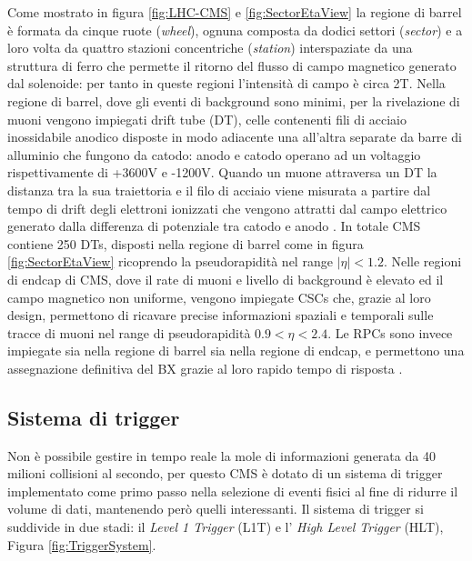 Come mostrato in figura \ref{fig:LHC-CMS} e \ref{fig:SectorEtaView} la regione di barrel è formata da cinque ruote (\textit{wheel}), ognuna composta da dodici settori (\textit{sector}) e a loro volta da quattro stazioni concentriche (\textit{station}) interspaziate da una struttura di ferro che permette il ritorno del flusso di campo magnetico generato dal solenoide: per tanto in queste regioni l'intensità di campo è circa 2T. Nella regione di barrel, dove gli eventi di background sono minimi, per la rivelazione di muoni vengono impiegati drift tube (DT), celle contenenti fili di acciaio inossidabile anodico disposte in modo adiacente una all'altra separate da barre di alluminio che fungono da catodo: anodo e catodo operano ad un voltaggio rispettivamente di +3600V e -1200V. Quando un muone attraversa un DT la distanza tra la sua traiettoria e il filo di acciaio viene misurata a partire dal tempo di drift degli elettroni ionizzati che vengono attratti dal campo elettrico generato dalla differenza di potenziale tra catodo e anodo \cite{MasterThesisNicLai}. \newline
In totale CMS contiene 250 DTs, disposti nella regione di barrel come in figura \ref{fig:SectorEtaView} ricoprendo la pseudorapidità nel range $|\eta| < 1.2$. \newline
Nelle regioni di endcap di CMS, dove il rate di muoni e livello di background è elevato ed il campo magnetico non uniforme, vengono impiegate CSCs che, grazie al loro design, permettono di ricavare precise informazioni spaziali e temporali sulle tracce di muoni nel range di pseudorapidità $0.9 < \eta < 2.4$. Le RPCs sono invece impiegate sia nella regione di barrel sia nella regione di endcap, e permettono una assegnazione definitiva del BX grazie al loro rapido tempo di risposta \cite{MasterThesisNicLai, cms2008cms}.


\subsection{Sistema di trigger}
\label{sec:SistemaDiTrigger}

Non è possibile gestire in tempo reale la mole di informazioni generata da 40 milioni collisioni al secondo, per questo CMS è dotato di un sistema di trigger implementato come primo passo nella selezione di eventi fisici al fine di ridurre il volume di dati, mantenendo però quelli interessanti. Il sistema di trigger si suddivide in due stadi: il \textit{Level 1 Trigger} (L1T) e l' \textit{High Level Trigger} (HLT), Figura \ref{fig:TriggerSystem}. 


